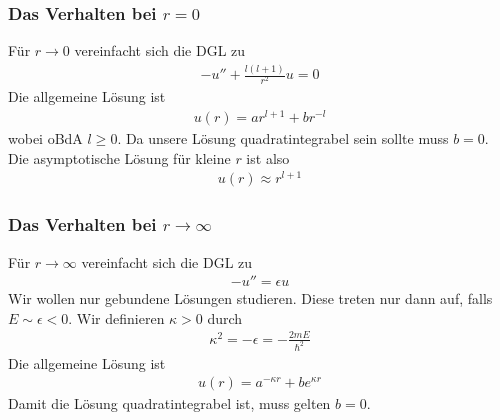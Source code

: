 \subsubsection{Das Verhalten bei $r=0$}

Für $r \rightarrow 0$ vereinfacht sich die DGL zu
\begin{align*}
    -u'' + \frac{l(l+1)}{r^2} u = 0
\end{align*}
Die allgemeine Lösung ist
\begin{align*}
    u(r) = a r^{l+1} + b r^{-l}
\end{align*}
wobei oBdA $l \geq 0$. Da unsere Lösung quadratintegrabel sein sollte muss $b=0$.
Die asymptotische Lösung für kleine $r$ ist also
\begin{align*}
    u(r) \approx r^{l+1}
\end{align*}

\subsubsection{Das Verhalten bei $r \rightarrow \infty$}

Für $r \rightarrow \infty$ vereinfacht sich die DGL zu
\begin{align*}
    -u'' = \epsilon u
\end{align*}
Wir wollen nur gebundene Lösungen studieren. Diese treten nur dann auf, falls
$E \sim \epsilon < 0$. Wir definieren $\kappa > 0$ durch
\begin{align*}
    \kappa^2 = - \epsilon = - \frac{2 m E}{\hbar^2}
\end{align*}
Die allgemeine Lösung ist
\begin{align*}
    u(r) = a^{- \kappa r} + b e^{\kappa r}
\end{align*}
Damit die Lösung quadratintegrabel ist, muss gelten $b=0$.

\vspace{1\baselineskip}

